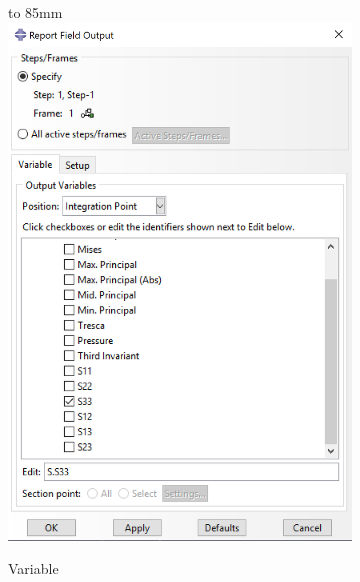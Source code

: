 \documentclass[spanish,a4paper,12pt]{article}
\def\imagebox#1#2{\vtop to #1{\null\hbox{#2}\vfill}}
\begin{document}
\begin{figure}
\centering
\captionsetup[subfigure]{justification=centering,singlelinecheck=false}
  \begin{subfigure}[b]{0.36\textwidth}
  \hspace{0mm}
    \imagebox{85mm}{\includegraphics[scale=0.35]{capturas/out1.png}}
    \caption{Variable\label{fig:out1a}}
  \end{subfigure}
  \begin{subfigure}[b]{0.36\textwidth}
  \hspace{5mm}

\end{subfigure}
\end{figure}
\end{document}
